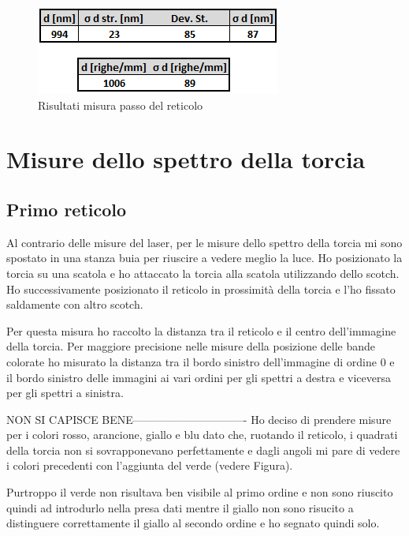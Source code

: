 \documentclass{article}
\begin{document}
\begin{figure}[h!]
  \centering
  \includegraphics[width=0.4\linewidth]{IM risultati laser 2}
  \caption{Risultati misura passo del reticolo}
\end{figure}




\pagebreak
\section{Misure dello spettro della torcia}
\subsection{Primo reticolo}
Al contrario delle misure del laser, per le misure dello spettro della torcia mi sono spostato in una stanza buia per riuscire a vedere meglio la luce. Ho posizionato la torcia su una scatola e ho attaccato la torcia alla scatola utilizzando dello scotch. Ho successivamente posizionato il reticolo in prossimità della torcia e l'ho fissato saldamente con altro scotch.

\vspace{3mm}

Per questa misura ho raccolto la distanza tra il reticolo e il centro dell'immagine della torcia. Per maggiore precisione nelle misure della posizione delle bande colorate ho misurato la distanza tra il bordo sinistro dell'immagine di ordine 0 e il bordo sinistro delle immagini ai vari ordini per gli spettri a destra e viceversa per gli spettri a sinistra. 

\vspace{3mm}
NON SI CAPISCE BENE-------------------------------
Ho deciso di prendere misure per i colori rosso, arancione, giallo e blu dato che, ruotando il reticolo, i quadrati della torcia non si sovrapponevano perfettamente e dagli angoli mi pare di vedere i colori precedenti con l'aggiunta del verde (vedere Figura).%
 
\vspace{3mm}

Purtroppo il verde non risultava ben visibile al primo ordine e non sono riuscito quindi ad introdurlo nella presa dati mentre il giallo non sono risucito a distinguere correttamente il giallo al secondo ordine e ho segnato quindi solo.
\end{document}
